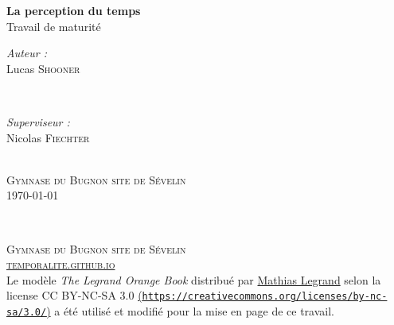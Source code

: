 \documentclass[12pt,fleqn,oneside,openany]{book} %
\begin{document}

\begingroup
\thispagestyle{empty}
\centering
\vspace*{6,8cm}
\par\normalfont\fontsize{35}{35}\sffamily\selectfont

\textbf{La perception du temps}\\
{\LARGE Travail de maturité}\par %
\vspace*{0,8cm}
\begin{minipage}{0.445\textwidth}
	\begin{flushleft} \large
		\emph{Auteur :}\\
		{\Large Lucas \textsc{Shooner}} %
	\end{flushleft}
\end{minipage}
~
\begin{minipage}{0.445\textwidth}
	\begin{flushright} \large
		\emph{Superviseur :} \\
		{\Large Nicolas \textsc{Fiechter}} %
	\end{flushright}
\end{minipage} \\ 
{{\large \textsc{Gymnase du Bugnon site de Sévelin}}} \\
{\large \today}\\ \par
\endgroup


\newpage
~\vfill
\thispagestyle{empty}


\noindent \textsc{Gymnase du Bugnon site de Sévelin}\\

\noindent \textsc{\href{https://temporalite.github.io}{temporalite.github.io}}\\ 

\noindent Le modèle \emph{The Legrand Orange Book} distribué par \href{legrand.mathias@gmail.com}{Mathias Legrand} selon la license CC BY-NC-SA 3.0 \href{https://creativecommons.org/licenses/by-nc-sa/3.0/}{ (\texttt{https://creativecommons.org/licenses/by-nc-sa/3.0/})} a été utilisé et modifié pour la mise en page de ce travail. \\ 
\end{document}
